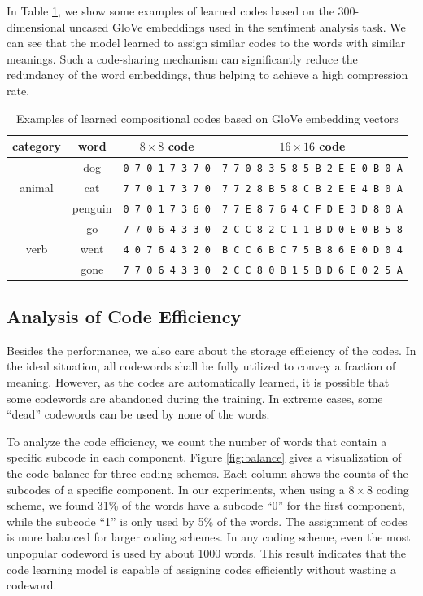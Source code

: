 \documentclass{article} %
\begin{document}
In Table \ref{table:examples}, we show some examples of learned codes based on the 300-dimensional uncased GloVe embeddings used in the sentiment analysis task. We can see that the model learned to assign similar codes to the words with similar meanings. Such a code-sharing mechanism can significantly reduce the redundancy of the word embeddings, thus helping to achieve a high compression rate.

\begin{table}[h]
\begin{center}
    \begin{tabular}{c|c|c|c}
    \hline \hline
    {\bf category}  & {\bf word} & {\bf $8 \times 8$ code}  & {\bf $16 \times 16$ code} \\
    \hline
    & dog & \texttt{0 7 0 1 7 3 7 0} & \texttt{7 7 0 8 3 5 8 5 B 2 E E 0 B 0 A} \\
    animal & cat & \texttt{7 7 0 1 7 3 7 0} & \texttt{7 7 2 8 B 5 8 C B 2 E E 4 B 0 A}\\
      & penguin & \texttt{0 7 0 1 7 3 6 0} & \texttt{7 7 E 8 7 6 4 C F D E 3 D 8 0 A} \\
    \hline
    & go & \texttt{7 7 0 6 4 3 3 0} & \texttt{2 C C 8 2 C 1 1 B D 0 E 0 B 5 8} \\
    verb & went & \texttt{4 0 7 6 4 3 2 0} & \texttt{B C C 6 B C 7 5 B 8 6 E 0 D 0 4} \\
      & gone & \texttt{7 7 0 6 4 3 3 0} & \texttt{2 C C 8 0 B 1 5 B D 6 E 0 2 5 A} \\
    \hline \hline
    \end{tabular}
    \caption{Examples of learned compositional codes based on GloVe embedding vectors}
    \label{table:examples}
\end{center}
\end{table}


\subsection{Analysis of Code Efficiency}
Besides the performance, we also care about the storage efficiency of the codes. In the ideal situation, all codewords shall be fully utilized to convey a fraction of meaning. However, as the codes are automatically learned, it is possible that some codewords are abandoned during the training. In extreme cases, some ``dead'' codewords can be used by none of the words. 

To analyze the code efficiency, we count the number of words that contain a specific subcode in each component. Figure \ref{fig:balance} gives a visualization of the code balance for three coding schemes. Each column shows the counts of the subcodes of a specific component. In our experiments, when using a $8 \times 8$ coding scheme, we found 31\% of the words have a subcode ``0'' for the first component, while the subcode ``1'' is only used by 5\% of the words. The assignment of codes is more balanced for larger coding schemes. In any coding scheme, even the most unpopular codeword is used by about 1000 words. This result indicates that the code learning model is capable of assigning codes efficiently without wasting a codeword.
\end{document}
